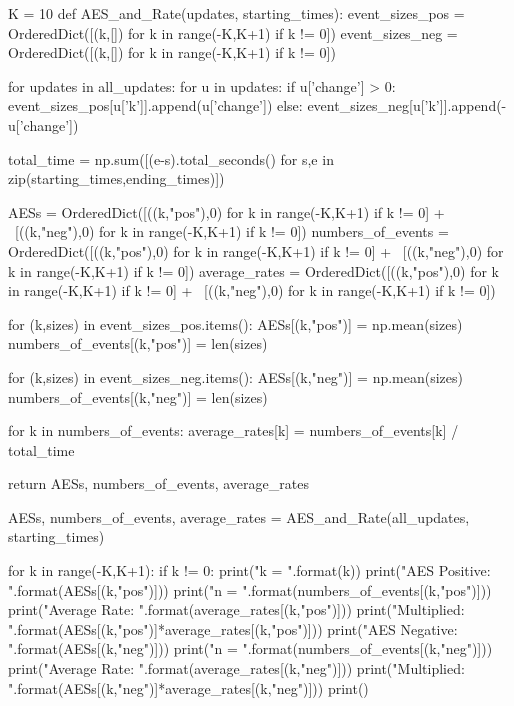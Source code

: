 K = 10
def AES_and_Rate(updates, starting_times):
    event_sizes_pos = OrderedDict([(k,[]) for k in range(-K,K+1) if k != 0])
    event_sizes_neg = OrderedDict([(k,[]) for k in range(-K,K+1) if k != 0])
    
    for updates in all_updates:
        for u in updates:
            if u['change'] > 0:
                event_sizes_pos[u['k']].append(u['change'])
            else:
                event_sizes_neg[u['k']].append(-u['change'])
                
    total_time = np.sum([(e-s).total_seconds() for s,e in zip(starting_times,ending_times)])
                
    AESs = OrderedDict([((k,"pos"),0) for k in range(-K,K+1) if k != 0] + \
                       [((k,"neg"),0) for k in range(-K,K+1) if k != 0])
    numbers_of_events = OrderedDict([((k,"pos"),0) for k in range(-K,K+1) if k != 0] + \
                                   [((k,"neg"),0) for k in range(-K,K+1) if k != 0])
    average_rates = OrderedDict([((k,"pos"),0) for k in range(-K,K+1) if k != 0] + \
                                [((k,"neg"),0) for k in range(-K,K+1) if k != 0])
    
    for (k,sizes) in event_sizes_pos.items():
        AESs[(k,"pos")] = np.mean(sizes)
        numbers_of_events[(k,"pos")] = len(sizes)
        
    for (k,sizes) in event_sizes_neg.items():
        AESs[(k,"neg")] = np.mean(sizes)
        numbers_of_events[(k,"neg")] = len(sizes)
        
    for k in numbers_of_events:
        average_rates[k] = numbers_of_events[k] / total_time
        
    return AESs, numbers_of_events, average_rates
            

AESs, numbers_of_events, average_rates = AES_and_Rate(all_updates, starting_times)

for k in range(-K,K+1):
    if k != 0:
        print("k = {}".format(k))
        print("AES Positive: {}".format(AESs[(k,"pos")]))
        print("n = {}".format(numbers_of_events[(k,"pos")]))
        print("Average Rate: {}".format(average_rates[(k,"pos")]))
        print("Multiplied: {}".format(AESs[(k,"pos")]*average_rates[(k,"pos")]))
        print("AES Negative: {}".format(AESs[(k,"neg")]))
        print("n = {}".format(numbers_of_events[(k,"neg")]))
        print("Average Rate: {}".format(average_rates[(k,"neg")]))
        print("Multiplied: {}".format(AESs[(k,"neg")]*average_rates[(k,"neg")]))
        print()